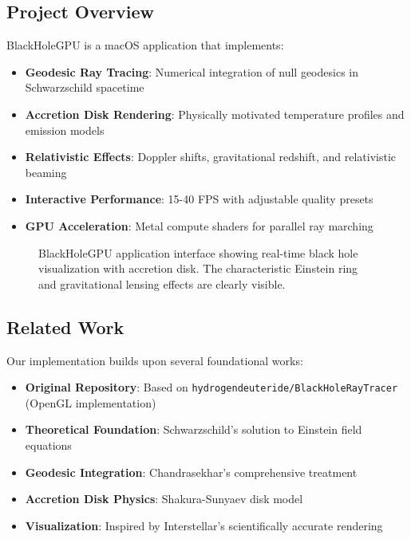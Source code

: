 \documentclass[12pt,a4paper]{article}
\theoremstyle{definition}
\theoremstyle{remark}
\begin{document}
\subsection{Project Overview}

BlackHoleGPU is a macOS application that implements:

\begin{itemize}
    \item \textbf{Geodesic Ray Tracing}: Numerical integration of null geodesics in Schwarzschild spacetime
    \item \textbf{Accretion Disk Rendering}: Physically motivated temperature profiles and emission models
    \item \textbf{Relativistic Effects}: Doppler shifts, gravitational redshift, and relativistic beaming
    \item \textbf{Interactive Performance}: 15-40 FPS with adjustable quality presets
    \item \textbf{GPU Acceleration}: Metal compute shaders for parallel ray marching
\end{itemize}

\begin{figure}[H]
    \centering
    \caption{BlackHoleGPU application interface showing real-time black hole visualization with accretion disk. The characteristic Einstein ring and gravitational lensing effects are clearly visible.}
    \label{fig:app_screenshot}
\end{figure}

\subsection{Related Work}

Our implementation builds upon several foundational works:

\begin{itemize}
    \item \textbf{Original Repository}: Based on \texttt{hydrogendeuteride/BlackHoleRayTracer} (OpenGL implementation)
    \item \textbf{Theoretical Foundation}: Schwarzschild's solution to Einstein field equations \cite{Schwarzschild1916}
    \item \textbf{Geodesic Integration}: Chandrasekhar's comprehensive treatment \cite{Chandrasekhar1983}
    \item \textbf{Accretion Disk Physics}: Shakura-Sunyaev disk model \cite{ShakuraSunyaev1973}
    \item \textbf{Visualization}: Inspired by Interstellar's scientifically accurate rendering \cite{James2015}
\end{itemize}
\end{document}
